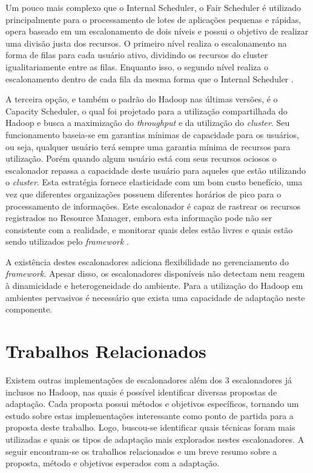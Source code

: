 Um pouco mais complexo que o Internal Scheduler, o Fair Scheduler é utilizado principalmente para o processamento de lotes de aplicações pequenas e rápidas, opera baseado em um escalonamento de dois níveis e possui o objetivo de realizar uma divisão justa dos recursos. O primeiro nível realiza o escalonamento na forma de filas para cada usuário ativo, dividindo os recursos do cluster igualitariamente entre as filas. Enquanto isso, o segundo nível realiza o escalonamento dentro de cada fila da mesma forma que o Internal Scheduler \cite{FairScheduler}. 

A terceira opção, e também o padrão do Hadoop nas últimas versões, é o Capacity Scheduler, o qual foi projetado para a utilização compartilhada do Hadoop e busca a maximização do \textit{throughput} e da utilização do \textit{cluster}. Seu funcionamento baseia-se em garantias mínimas de capacidade para os usuários, ou seja, qualquer usuário terá sempre uma garantia mínima de recursos para utilização. Porém quando algum usuário está com seus recursos ociosos o escalonador repassa a capacidade deste usuário  para aqueles que estão utilizando o \textit{cluster}. Esta estratégia fornece elasticidade com um bom custo benefício, uma vez que diferentes organizações possuem diferentes horários de pico para o processamento de informações. Este escalonador é capaz de rastrear os recursos registrados no Resource Manager, embora esta informação pode não ser consistente com a realidade, e monitorar quais deles estão livres e quais estão sendo utilizados pelo \textit{framework} \cite{CapacityScheduler}.

A existência destes escalonadores adiciona flexibilidade no gerenciamento do \textit{framework}. Apesar disso, os escalonadores disponíveis não detectam nem reagem à dinamicidade e heterogeneidade do ambiente. Para a utilização do Hadoop em ambientes pervasivos é necessário que exista uma capacidade de adaptação neste componente.





\section{Trabalhos Relacionados}
Existem outras implementações de escalonadores além dos 3 escalonadores já inclusos no Hadoop, nas quais é possível identificar diversas propostas de adaptação. Cada proposta possui métodos e objetivos específicos, tornando um estudo sobre estas implementações interessante como ponto de partida para a proposta deste trabalho. Logo, buscou-se identificar quais técnicas foram mais utilizadas e quais os tipos de adaptação mais explorados nestes escalonadores. A seguir encontram-se os trabalhos relacionados e um breve resumo sobre a proposta, método e objetivos esperados com a adaptação.



